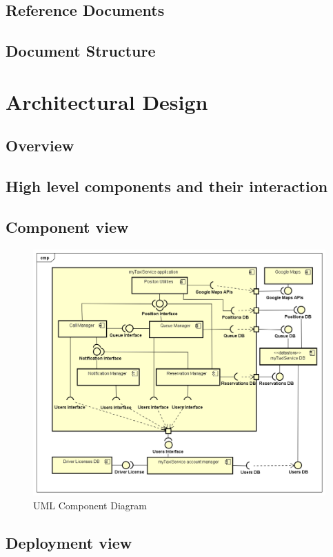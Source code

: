 \documentclass[a4paper]{article}
\let\stdsection\section
\renewcommand\section{\newpage\stdsection}
\begin{document}
\subsection{Reference Documents}

\subsection{Document Structure}

\section{Architectural Design}
\subsection{Overview}
\subsection{High level components and their interaction}

\subsection{Component view}

\begin{figure}[H]
\includegraphics[width=.9\textwidth]{ComponentDiagram}
\centering
\caption{UML Component Diagram}
\label{fig:componentsiagram}
\end{figure}

\subsection{Deployment view}
\end{document}
